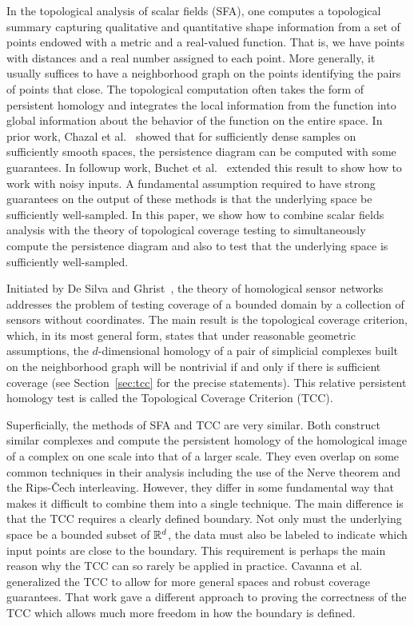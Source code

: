 
In the topological analysis of scalar fields (SFA), one computes a topological summary capturing qualitative and quantitative shape information from a set of points endowed with a metric and a real-valued function.
That is, we have points with distances and a real number assigned to each point.
More generally, it usually suffices to have a neighborhood graph on the points identifying the pairs of points that close.
The topological computation often takes the form of persistent homology and integrates the local information from the function into global information about the behavior of the function on the entire space.
In prior work, Chazal et al.~\cite{chazal09analysis} showed that for sufficiently dense samples on sufficiently smooth spaces, the persistence diagram can be computed with some guarantees.
In followup work, Buchet et al.~\cite{buchet15topological} extended this result to show how to work with noisy inputs.
A fundamental assumption required to have strong guarantees on the output of these methods is that the underlying space be sufficiently well-sampled.
In this paper, we show how to combine scalar fields analysis with the theory of topological coverage testing to simultaneously compute the persistence diagram and also to test that the underlying space is sufficiently well-sampled.

Initiated by De Silva and Ghrist~\cite{desilva06coordinate,desilva07coverage,desilva07homological}, the theory of homological sensor networks addresses the problem of testing coverage of a bounded domain by a collection of sensors without coordinates.
The main result is the topological coverage criterion, which, in its most general form, states that under reasonable geometric assumptions, the $d$-dimensional homology of a pair of simplicial complexes built on the neighborhood graph will be nontrivial if and only if there is sufficient coverage (see Section~\ref{sec:tcc} for the precise statements).
This relative persistent homology test is called the Topological Coverage Criterion (TCC).

Superficially, the methods of SFA and TCC are very similar.
Both construct similar complexes and compute the persistent homology of the homological image of a complex on one scale into that of a larger scale.
They even overlap on some common techniques in their analysis including the use of the Nerve theorem and the Rips-\v{C}ech interleaving.
However, they differ in some fundamental way that makes it difficult to combine them into a single technique.
The main difference is that the TCC requires a clearly defined boundary.
Not only must the underlying space be a bounded subset of $\mathbb{R}^d$, the data must also be labeled to indicate which input points are close to the boundary.
This requirement is perhaps the main reason why the TCC can so rarely be applied in practice.
Cavanna et al.~\cite{cavanna2017when} generalized the TCC to allow for more general spaces and robust coverage guarantees.
That work gave a different approach to proving the correctness of the TCC which allows much more freedom in how the boundary is defined.


